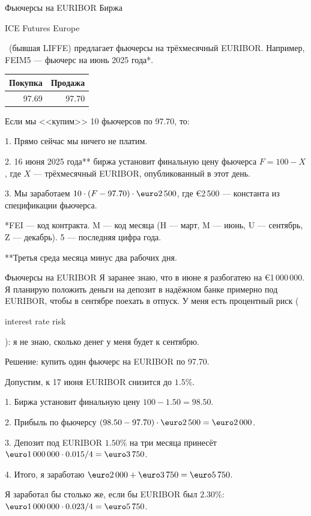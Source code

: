 \documentclass{beamer}
\renewcommand{\EUR}[1]{\textup{\euro}#1}
\newcommand{\en}[1]{\begin{otherlanguage}{english}#1\end{otherlanguage}}
\begin{document}
\begin{frame}{Фьючерсы на EURIBOR}
\justify
Биржа \en{ICE Futures Europe}\ (бывшая LIFFE) предлагает фьючерсы на трёхмесячный EURIBOR. Например, \alert{FEIM5} --- фьючерс на июнь 2025 года*.

\justify
\centering
\begin{tabular}{r|r}
Покупка & Продажа \\ \hline
97.69 & 97.70
\end{tabular}

\justify
Если мы <<купим>> 10 фьючерсов по 97.70, то:

1. Прямо сейчас мы ничего не платим.

2. 16 июня 2025 года** биржа установит финальную цену фьючерса $F = 100 - X$, где 
$X$ --- трёхмесячный EURIBOR, опубликованный в этот день.

3. Мы заработаем $10 \cdot (F - 97.70) \cdot \EUR{2\,500}$, где \EUR{2\,500} --- 
константа из спецификации фьючерса.

\justify
*FEI --- код контракта. M --- код месяца (H --- март, M --- июнь, U --- сентябрь, Z --- 
декабрь). 5 --- последняя цифра года.

\justify
**Третья среда месяца минус два рабочих дня.
\end{frame}



\begin{frame}{Фьючерсы на EURIBOR}
\justify
Я заранее знаю, что в июне я разбогатею на \EUR{1\,000\,000}. Я планирую положить деньги на депозит в надёжном банке примерно под EURIBOR, чтобы в сентябре поехать в отпуск. У меня есть \alert{процентный риск} (\en{interest rate risk}): я не знаю, сколько денег у меня будет к сентябрю.

\justify
Решение: купить один фьючерс на EURIBOR по 97.70.

\justify
Допустим, к 17 июня EURIBOR снизится до $1.5\%$.

1. Биржа установит финальную цену $100 - 1.50 = 98.50$.

2. Прибыль по фьючерсу $(98.50-97.70)\cdot\EUR{2\,500} = \EUR{2\,000}$.

3. Депозит под EURIBOR $1.50\%$ на три месяца принесёт
$\EUR{1\,000\,000} \cdot 0.015 / 4 = \EUR{3\,750}$.

4. Итого, я заработаю $\EUR{2\,000} + \EUR{3\,750} = \EUR{5\,750}$.

\justify
Я заработал бы столько же, если бы EURIBOR был $2.30\%$: $\EUR{1\,000\,000} \cdot 0.023/4 =\EUR{5\,750}$.
\end{frame}
\end{document}
